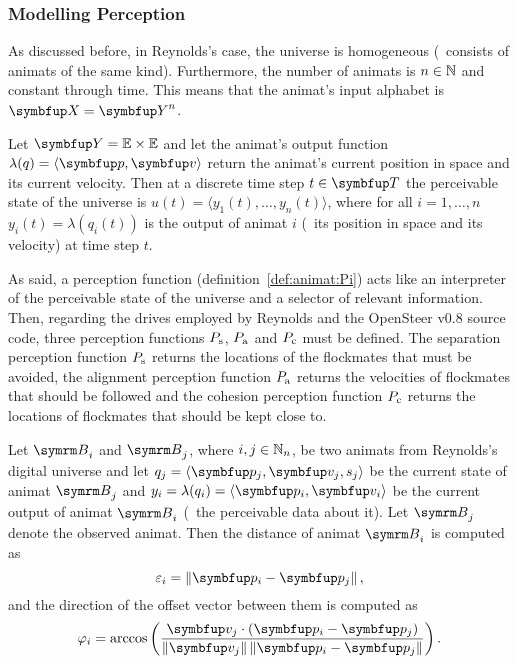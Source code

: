 \subsubsection{Modelling Perception}
As discussed before, in Reynolds's case, the universe is homogeneous (\ie\ consists of animats of the same kind). Furthermore, the number of animats is $n \in \mathbb{N}$ and constant through time. This means that the animat's input alphabet is $\set{X}=\set{Y}^n$.

Let $\set{Y}=\E \times \E$ and let the animat's output function $\lambda(q)=\langle\vect{p},\vect{v}\rangle$ return the animat's current position in space and its current velocity. Then at a discrete time step $t \in \set{T}$ the perceivable state of the universe is $u(t)=\langle y_1(t),\ldots,y_n(t)\rangle$, where for all $i=1,\ldots,n$ $y_i(t)=\lambda(q_i(t))$ is the output of animat $i$ (\ie\ its position in space and its velocity) at time step $t$.

As said, a perception function (definition~\ref{def:animat:Pi}) acts like an interpreter of the perceivable state of the universe and a selector of relevant information. Then, regarding the drives employed by Reynolds and the OpenSteer v0.8 source code, three perception functions $P_\textnormal{s}$, $P_\textnormal{a}$ and $P_\textnormal{c}$ must be defined. The separation perception function $P_\textnormal{s}$ returns the locations of the flockmates that must be avoided, the alignment perception function $P_\textnormal{a}$ returns the velocities of flockmates that should be followed and the cohesion perception function $P_\textnormal{c}$ returns the locations of flockmates that should be kept close to.

Let $\autom{B}_i$ and $\autom{B}_j$, where $i,j \in \mathbb{N}_n$, be two animats from Reynolds's digital universe and let $q_j=\langle\vect{p}_j,\vect{v}_j,s_j\rangle$ be the current state of animat $\autom{B}_j$ and $y_i=\lambda(q_i)=\langle \vect{p}_i,\vect{v}_i \rangle$ be the current output of animat $\autom{B}_i$ (\ie\ the perceivable data about it). Let $\autom{B}_j$ denote the observed animat. Then the distance of animat $\autom{B}_i$ is computed as
%
\begin{equation}
  \varepsilon_i=\left\|\vect{p}_i - \vect{p}_j\right\|, \label{eq:animat:cwr:distance}
\end{equation}
%
and the direction of the offset vector between them is computed as
%
\begin{equation}
  \varphi_i=\arccos \left( \frac {\vect{v}_j \cdot (\vect{p}_i - \vect{p}_j)}{\left\| \vect{v}_j \right\| \left\| \vect{p}_i - \vect{p}_j \right\|} \right). \label{eq:animat:cwr:angularOffset}
\end{equation}

